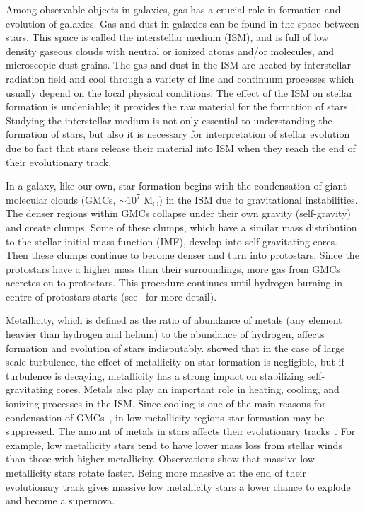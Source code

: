 Among observable objects in galaxies, gas has a crucial role in formation and evolution of galaxies.
Gas and dust in galaxies can be found in the space between stars.
This space is called the interstellar medium (ISM), and is full of low density gaseous clouds with neutral or ionized atoms and/or molecules, and microscopic dust grains.
The gas and dust in the ISM are heated by interstellar radiation field and cool through a variety of line and continuum processes which usually depend on the local physical conditions. 
The effect of the ISM on stellar formation is undeniable; it provides the raw material for the formation of stars~\citep[e.g.][]{Kennicutt08,Bigiel08}.
Studying the interstellar medium is not only essential to understanding the formation of stars, but also it is necessary for interpretation of stellar evolution due to fact that stars release their material into ISM when they reach the end of their evolutionary track.

In a galaxy, like our own, star formation begins with the condensation of giant molecular clouds (GMCs, $\sim 10^7$ M$_{\odot}$) in the ISM due to gravitational instabilities. 
The denser regions within GMCs collapse under their own gravity (self-gravity) and create clumps.
Some of these clumps, which have a similar mass distribution to the stellar initial mass function (IMF), develop into self-gravitating cores.
Then these clumps continue to become denser and turn into protostars. 
Since the protostars have a higher mass than their surroundings, more gas from GMCs accretes on to protostars.
This procedure continues until hydrogen burning in centre of protostars starts (see~\cite{McKee07} for more detail). 

Metallicity, which is defined as the ratio of abundance of metals (any element heavier than hydrogen and helium) to the abundance of hydrogen, affects formation and evolution of stars indisputably.
\cite{Walch11} showed that in the case of large scale turbulence, the effect of metallicity on star formation is negligible, but if turbulence is decaying,  metallicity has a strong impact on stabilizing self-gravitating cores.
Metals also play an important role in heating, cooling, and ionizing processes in the ISM.
Since cooling is one of the main reasons for condensation of GMCs~\citep[e.g.][]{Maio07}, in low metallicity regions star formation may be suppressed. 
The amount of metals in stars affects their evolutionary tracks~\citep[e.g.][and references therein]{Maeder02}.
For example, low metallicity stars tend to have lower mass loss from stellar winds than those with higher metallicity.
Observations show that massive low metallicity stars rotate faster.
Being more massive at the end of their evolutionary track gives massive low metallicity stars a lower chance to explode and become a supernova.


